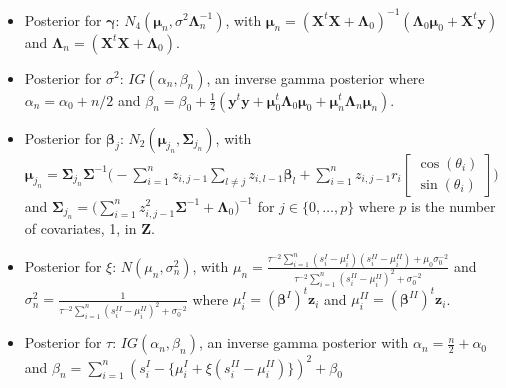 \documentclass[12pt,]{article}
\begin{document}
\begin{enumerate}
\begin{itemize}
\item Posterior for $\boldsymbol{\gamma}$: $N_4(\boldsymbol{\mu}_n, \sigma^2\boldsymbol{\Lambda}^{-1}_n)$, with $\boldsymbol{\mu}_n = (\boldsymbol{X}^t\boldsymbol{X} + \boldsymbol{\Lambda}_0)^{-1}(\boldsymbol{\Lambda}_0\boldsymbol{\mu}_0 + \boldsymbol{X}^t\boldsymbol{y})$ and $\boldsymbol{\Lambda}_n = (\boldsymbol{X}^t\boldsymbol{X} + \boldsymbol{\Lambda}_0)$.
\item Posterior for $\sigma^2$: $IG(\alpha_{n}, \beta_{n})$, an inverse gamma posterior where $\alpha_{n} = \alpha_0 + n/2$ and $\beta_{n} = \beta_0 + \frac{1}{2}(\boldsymbol{y}^t\boldsymbol{y} + \boldsymbol{\mu}_{0}^t\boldsymbol{\Lambda}_0\boldsymbol{\mu}_{0} + \boldsymbol{\mu}_{n}^t\boldsymbol{\Lambda}_n\boldsymbol{\mu}_{n})$.
\item Posterior for $\boldsymbol{\beta}_j$: $N_2(\boldsymbol{\mu}_{j_{n}}, \boldsymbol{\Sigma}_{j_{n}})$, with $\boldsymbol{\mu}_{j_{n}} = \boldsymbol{\Sigma}_{j_{n}}\boldsymbol{\Sigma}^{-1}\Bigg(-\sum_{i=1}^{n}z_{i,j-1}\sum_{l\neq j}z_{i,l-1}\boldsymbol{\beta}_l + \sum_{i=1}^{n}z_{i,j-1}r_i\begin{bmatrix} \cos (\theta_i) \\ \sin (\theta_i)\end{bmatrix}\Bigg)$ and  $\boldsymbol{\Sigma}_{j_{n}} = \Big(\sum_{i=1}^{n}z_{i,j-1}^2\boldsymbol{\Sigma}^{-1}+\boldsymbol{\Lambda}_0\Big)^{-1}$ for $j \in \{0, \dots, p\}$ where $p$ is the number of covariates, 1, in $\boldsymbol{Z}$.
\item Posterior for $\xi$: $N(\mu_n, \sigma^2_n)$, with $\mu_n = \frac{\tau^{-2} \sum_{i=1}^{n}(s^{I}_{i} - \mu_i^{I})(s^{II}_{i} - \mu_i^{II}) + \mu_0\sigma_0^{-2}}{\tau^{-2}\sum_{i=1}^{n}(s^{II}_{i} - \mu_i^{II})^2 + \sigma_0^{-2}}$ and $\sigma_n^2 = \frac{1}{\tau^{-2}\sum_{i=1}^{n}(s^{II}_{i} - \mu_i^{II})^2 + \sigma_0^{-2}}$ where $\mu_i^{I} = (\boldsymbol{\beta}^{I})^t\boldsymbol{z}_i$ and $\mu_i^{II} = (\boldsymbol{\beta}^{II})^t\boldsymbol{z}_i$. 
\item Posterior for $\tau$: $IG(\alpha_n, \beta_n)$, an inverse gamma posterior with $\alpha_n = \frac{n}{2} + \alpha_0$ and $\beta_n = \sum\limits_{i = 1}^{n}(s^{I}_{i} - \{\mu_i^{I} + \xi(s^{II}_{i} - \mu_i^{II})\})^2 + \beta_0$
\end{itemize}


\end{enumerate}
\end{document}
